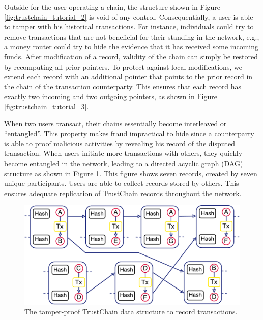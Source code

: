 Outside for the user operating a chain, the structure shown in Figure \ref{fig:trustchain_tutorial_2} is void of any control.
Consequentially, a user is able to tamper with his historical transactions.
For instance, individuals could try to remove transactions that are not beneficial for their standing in the network, e.g., a money router could try to hide the evidence that it has received some incoming funds.
After modification of a record, validity of the chain can simply be restored by recomputing all prior pointers.
To protect against local modifications, we extend each record with an additional pointer that points to the prior record in the chain of the transaction counterparty.
This ensures that each record has exactly two incoming and two outgoing pointers, as shown in Figure \ref{fig:trustchain_tutorial_3}.

When two users transact, their chains essentially become interleaved or \enquote{entangled}.
This property makes fraud impractical to hide since a counterparty is able to proof malicious activities by revealing his record of the disputed transaction.
When users initiate more transactions with others, they quickly become entangled in the network, leading to a directed acyclic graph (DAG) structure as shown in Figure \ref{fig:trustchain}.
This figure shows seven records, created by seven unique participants.
Users are able to collect records stored by others.
This ensures adequate replication of TrustChain records throughout the network.

\begin{figure}[t]
	\centering
	\includegraphics[width=.9\linewidth]{iom/assets/trustchain}
	\caption{The tamper-proof TrustChain data structure to record transactions.}
	\label{fig:trustchain}
\end{figure}

